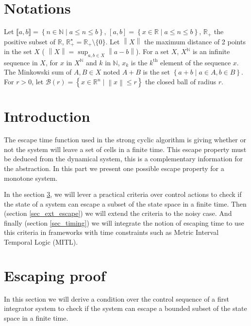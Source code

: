 \section{Notations}

Let $\llbracket a,b \rrbracket = \left \{n \in \mathbb{N} \mid a \leq n \leq b \right \}$, $\left [ a,b \right ]= \left \{x \in \mathbb{R} \mid a \leq n \leq b \right \}$, $\mathbb{R}_+$ the positive subset of $\mathbb{R}$, $\mathbb{R}_+^\star = \mathbb{R}_+ \setminus \{0\}$.
Let $\left \| X \right \|$ the maximum distance of 2 points in the set $X$ ( $\left \| X \right \| = \sup_{a,b \in X} \left \| a-b\right \|$).
For a set $X$, $X^{\mathbb{N}}$ is an infinite sequence in $X$, for $x$ in $X^{\mathbb{N}}$ and $k$ in $\mathbb{N}$, $x_k$ is the $k^{\textrm{th}}$ element of the sequence $x$.
The Minkowski sum of $A,B \in X$ noted $A+B$ is the set $\left \{a+b \mid a \in A, b\in B \right \}$.
For $r>0$, let $\mathcal{B}(r) = \left \{ x \in \mathbb{R}^n \mid \left \| x \right \| \leq r \right \}$ the closed ball of radius $r$.

\section{Introduction}
The escape time function used in the strong cyclic algorithm is giving whether or not the system will leave a set of cells in a finite time.
This escape property must be deduced from the dynamical system, this is a complementary information for the abstraction.
In this part we present one possible escape property for a monotone system.

In the section \ref{sec_escape}, we will lever a practical criteria over control actions to check if the state of a system can escape a subset of the state space in a finite time.
Then (section \ref{sec_ext_escape}) we will extend the criteria to the noisy case.
And finally (section \ref{sec_timing}) we will integrate the notion of escaping time to use this criteria in frameworks with time constraints such as Metric Interval Temporal Logic (MITL).

\section{Escaping proof}\label{sec_escape}
In this section we will derive a condition over the control sequence of a first integrator system to check if the system can escape a bounded subset of the state space in a finite time.

